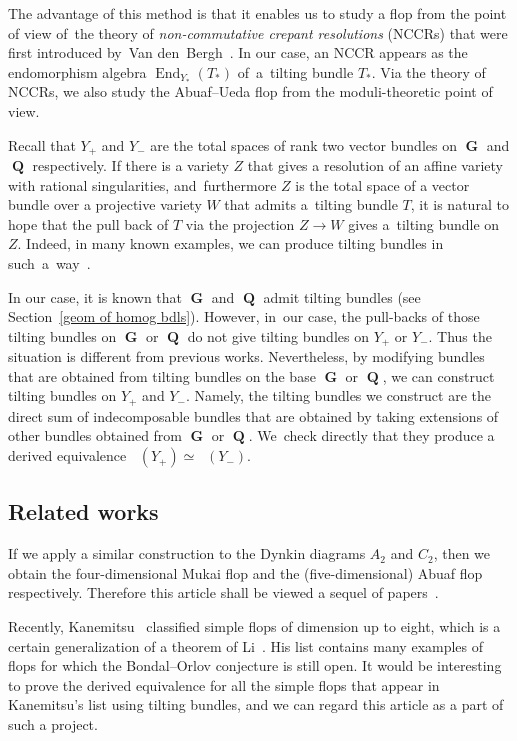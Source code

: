\documentclass[11pt]{article}
\DeclareMathOperator{\D}{D^b}
\DeclareMathOperator{\End}{End}
\DeclareMathOperator{\G}{\mathbf{G}}
\DeclareMathOperator{\Q}{\mathbf{Q}}
\numberwithin{equation}{section}
\begin{document}
The advantage of this method is that it enables us to study a flop
from the point of view of~the theory of \textit{non-commutative crepant resolutions} (NCCRs)
that were first introduced by~Van den~Bergh~\cite{VdB04b}.
In our case, an NCCR appears as the endomorphism algebra $\End_{Y_{\ast}}(T_{\ast})$ of~a~til\-ting bundle $T_{\ast}$.
Via the theory of NCCRs, we also study the Abuaf--Ueda flop from the moduli-theoretic point of view.

Recall that $Y_+$ and $Y_-$ are the total spaces of rank two vector bundles on $\G$ and $\Q$ respectively.
If there is a variety $Z$ that gives a resolution of an affine variety with rational singularities, and~furthermore
$Z$ is the total space of a vector bundle over a projective variety $W$ that admits a~tilting bundle $T$,
it is natural to hope that the pull back of $T$ via the projection $Z \to W$ gives a~tilting bundle on $Z$.
Indeed, in many known examples, we can produce tilting bundles in such~a~way~\cite{BLV10, H17a, WZ12}.

In our case, it is known that $\G$ and $\Q$ admit tilting bundles (see Section~\ref{geom of homog bdls}).
However, in~our case, the pull-backs of those tilting bundles on $\G$ or $\Q$ do not give tilting bundles on $Y_+$ or $Y_-$.
Thus the situation is different from previous works.
Nevertheless, by modifying bundles that are obtained from tilting bundles on the base $\G$ or $\Q$,
we can construct tilting bundles on $Y_+$ and $Y_-$.
Namely, the tilting bundles we construct are the direct sum of indecomposable bundles that are obtained by taking extensions of
other bundles obtained from $\G$ or $\Q$.
We~check directly that they produce a derived equivalence $\D(Y_+) \simeq \D(Y_-)$.



\subsection{Related works}
If we apply a similar construction to the Dynkin diagrams $A_2$ and $C_2$,
then we obtain the four-dimensional Mukai flop and the (five-dimensional) Abuaf flop~\cite{Seg16} respectively.
Therefore this article shall be viewed a sequel of papers~\cite{H17a, H17b, Seg16}.

Recently, Kanemitsu~\cite{Kan17} classified simple flops of dimension up to eight, which is a certain generalization of a theorem of Li~\cite{Li17}.
His list contains many examples of flops for which the Bondal--Orlov conjecture is still open.
It would be interesting to prove the derived equivalence for all the simple flops that appear in Kanemitsu's list using tilting bundles,
and we can regard this article as a part of such a project.
\end{document}
